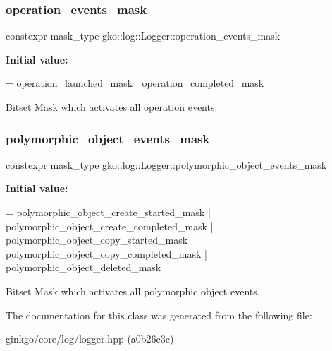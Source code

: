 \mbox{\label{classgko_1_1log_1_1Logger_a179f3d3ac86782922cbc63e33272840a}} 
\subsubsection{\texorpdfstring{operation\+\_\+events\+\_\+mask}{operation\_events\_mask}}
{\footnotesize\ttfamily constexpr mask\+\_\+type gko\+::log\+::\+Logger\+::operation\+\_\+events\+\_\+mask\hspace{0.3cm}{\ttfamily [static]}}

{\bfseries Initial value\+:}
\begin{DoxyCode}
=
        operation\_launched\_mask | operation\_completed\_mask
\end{DoxyCode}


Bitset Mask which activates all operation events. 

\mbox{\label{classgko_1_1log_1_1Logger_a5fb997f1c06c0602103d8dab616a96bc}} 
\subsubsection{\texorpdfstring{polymorphic\+\_\+object\+\_\+events\+\_\+mask}{polymorphic\_object\_events\_mask}}
{\footnotesize\ttfamily constexpr mask\+\_\+type gko\+::log\+::\+Logger\+::polymorphic\+\_\+object\+\_\+events\+\_\+mask\hspace{0.3cm}{\ttfamily [static]}}

{\bfseries Initial value\+:}
\begin{DoxyCode}
=
        polymorphic\_object\_create\_started\_mask |
        polymorphic\_object\_create\_completed\_mask |
        polymorphic\_object\_copy\_started\_mask |
        polymorphic\_object\_copy\_completed\_mask |
        polymorphic\_object\_deleted\_mask
\end{DoxyCode}


Bitset Mask which activates all polymorphic object events. 



The documentation for this class was generated from the following file\+:\begin{DoxyCompactItemize}
\item 
ginkgo/core/log/logger.\+hpp (a0b26c3c)\end{DoxyCompactItemize}
